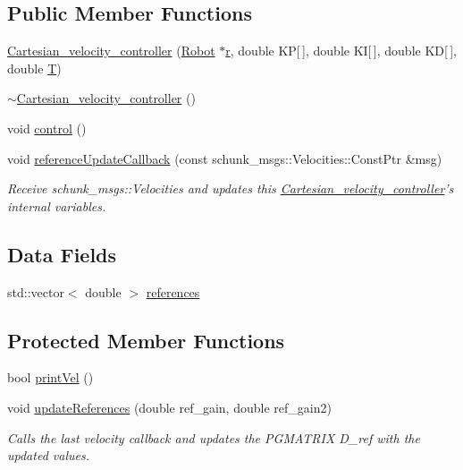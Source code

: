 \subsection*{Public Member Functions}
\begin{DoxyCompactItemize}
\item 
\hyperlink{classCartesian__velocity__controller_adc909b782b16fa12148302cc501300c6}{Cartesian\-\_\-velocity\-\_\-controller} (\hyperlink{structRobot}{Robot} $\ast$\hyperlink{classCartesian__controller_a5562129951bd802e4ded77fc716c87a0}{r}, double K\-P\mbox{[}$\,$\mbox{]}, double K\-I\mbox{[}$\,$\mbox{]}, double K\-D\mbox{[}$\,$\mbox{]}, double \hyperlink{classCartesian__controller_a35c6ddbb9624878f2807ff644a33e832}{T})
\item 
\hyperlink{classCartesian__velocity__controller_a6fd50fdb7e9e05ef99769e840cbb15c6}{$\sim$\-Cartesian\-\_\-velocity\-\_\-controller} ()
\item 
void \hyperlink{classCartesian__velocity__controller_a249bd167cd995e16906731172d1bc516}{control} ()
\item 
void \hyperlink{classCartesian__velocity__controller_a2f020f22b2e63da5afeff3f083e4095c}{reference\-Update\-Callback} (const schunk\-\_\-msgs\-::\-Velocities\-::\-Const\-Ptr \&msg)
\begin{DoxyCompactList}\small\item\em Receive schunk\-\_\-msgs\-::\-Velocities and updates this \hyperlink{classCartesian__velocity__controller}{Cartesian\-\_\-velocity\-\_\-controller}'s internal variables. \end{DoxyCompactList}\end{DoxyCompactItemize}
\subsection*{Data Fields}
\begin{DoxyCompactItemize}
\item 
std\-::vector$<$ double $>$ \hyperlink{classCartesian__velocity__controller_afc3792f1f6dd0025417d752a89e519e1}{references}
\end{DoxyCompactItemize}
\subsection*{Protected Member Functions}
\begin{DoxyCompactItemize}
\item 
bool \hyperlink{classCartesian__velocity__controller_ad5dbfc4b8ec4fad7bca9b9a4fd9358b4}{print\-Vel} ()
\item 
void \hyperlink{classCartesian__velocity__controller_a9b2c7f25b3fc2882f7e4590ee97e0978}{update\-References} (double ref\-\_\-gain, double ref\-\_\-gain2)
\begin{DoxyCompactList}\small\item\em Calls the last velocity callback and updates the P\-G\-M\-A\-T\-R\-I\-X D\-\_\-ref with the updated values. \end{DoxyCompactList}\end{DoxyCompactItemize}
